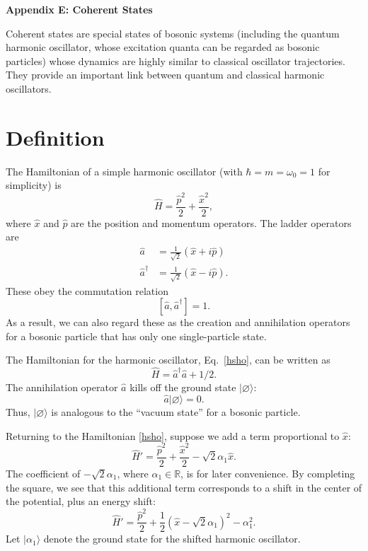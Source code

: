 \documentclass[pra,12pt]{revtex4}
\begin{document}
\begin{center}
{\large \textbf{Appendix E: Coherent States}}
\end{center}

Coherent states are special states of bosonic systems (including the
quantum harmonic oscillator, whose excitation quanta can be regarded
as bosonic particles) whose dynamics are highly similar to classical
oscillator trajectories.  They provide an important link between
quantum and classical harmonic oscillators.

\section{Definition}

The Hamiltonian of a simple harmonic oscillator (with $\hbar = m =
\omega_0 = 1$ for simplicity) is
\begin{equation}
  \hat{H} = \frac{\hat{p}^2}{2} + \frac{\hat{x}^2}{2},
  \label{hsho}
\end{equation}
where $\hat{x}$ and $\hat{p}$ are the position and momentum operators.
The ladder operators are
\begin{align}
  \hat{a} &= \frac{1}{\sqrt{2}} \left(\hat{x} + i\hat{p}\right)
  \label{a} \\
  \hat{a}^\dagger &= \frac{1}{\sqrt{2}} \left(\hat{x} - i\hat{p}\right).
  \label{adagger}
\end{align}
These obey the commutation relation
\begin{equation}
  \left[\hat{a}, \hat{a}^\dagger\right] = 1.
  \label{commutator}
\end{equation}
As a result, we can also regard these as the creation and annihilation
operators for a bosonic particle that has only one single-particle
state.

The Hamiltonian for the harmonic oscillator, Eq.~\eqref{hsho}, can be
written as
\begin{equation}
  \hat{H} = \hat{a}^\dagger\hat{a} + 1/2.
\end{equation}
The annihilation operator $\hat{a}$ kills off the ground state
$|\varnothing\rangle$:
\begin{equation}
  \hat{a} |\varnothing\rangle = 0.
  \label{annihilation}
\end{equation}
Thus, $|\varnothing\rangle$ is analogous to the ``vacuum state'' for a
bosonic particle.

Returning to the Hamiltonian \eqref{hsho}, suppose we add a term
proportional to $\hat{x}$:
\begin{equation}
  \hat{H}' = \frac{\hat{p}^2}{2} + \frac{\hat{x}^2}{2} - \sqrt{2}\alpha_1\hat{x}.
  \label{hshift}
\end{equation}
The coefficient of $-\sqrt{2}\alpha_1$, where $\alpha_1 \in
\mathbb{R}$, is for later convenience.  By completing the square, we
see that this additional term corresponds to a shift in the center of
the potential, plus an energy shift:
\begin{equation}
  \hat{H}' = \frac{\hat{p}^2}{2} + \frac{1}{2}\left(\hat{x} - \sqrt{2}\alpha_1\right)^2 - \alpha_1^2.
\end{equation}
Let $|\alpha_1\rangle$ denote the ground state for the shifted
harmonic oscillator.
\end{document}
